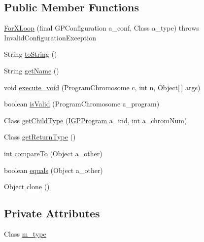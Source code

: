 \subsection*{Public Member Functions}
\begin{DoxyCompactItemize}
\item 
\hyperlink{classorg_1_1jgap_1_1gp_1_1function_1_1_for_x_loop_a1a98e5f661c0fe2ce33d090ce8a87ec1}{For\-X\-Loop} (final G\-P\-Configuration a\-\_\-conf, Class a\-\_\-type)  throws Invalid\-Configuration\-Exception 
\item 
String \hyperlink{classorg_1_1jgap_1_1gp_1_1function_1_1_for_x_loop_a7aac721900b06dcd76bf8a5586c49013}{to\-String} ()
\item 
String \hyperlink{classorg_1_1jgap_1_1gp_1_1function_1_1_for_x_loop_a34afe320938358af62df517607bf0496}{get\-Name} ()
\item 
void \hyperlink{classorg_1_1jgap_1_1gp_1_1function_1_1_for_x_loop_ae448f21b7912eec72d496b62669993e6}{execute\-\_\-void} (Program\-Chromosome c, int n, Object\mbox{[}$\,$\mbox{]} args)
\item 
boolean \hyperlink{classorg_1_1jgap_1_1gp_1_1function_1_1_for_x_loop_ae986998c90c40dfa08739a937613350f}{is\-Valid} (Program\-Chromosome a\-\_\-program)
\item 
Class \hyperlink{classorg_1_1jgap_1_1gp_1_1function_1_1_for_x_loop_a041680646bade06a1b730653aa372495}{get\-Child\-Type} (\hyperlink{interfaceorg_1_1jgap_1_1gp_1_1_i_g_p_program}{I\-G\-P\-Program} a\-\_\-ind, int a\-\_\-chrom\-Num)
\item 
Class \hyperlink{classorg_1_1jgap_1_1gp_1_1function_1_1_for_x_loop_afdf24e4274c58b8785a91dba857bebdb}{get\-Return\-Type} ()
\item 
int \hyperlink{classorg_1_1jgap_1_1gp_1_1function_1_1_for_x_loop_a4e15357fbf2370e77b1e3cf805e389b1}{compare\-To} (Object a\-\_\-other)
\item 
boolean \hyperlink{classorg_1_1jgap_1_1gp_1_1function_1_1_for_x_loop_a82a005d151cd276baf61cd5be6914656}{equals} (Object a\-\_\-other)
\item 
Object \hyperlink{classorg_1_1jgap_1_1gp_1_1function_1_1_for_x_loop_aaa0edc5219b9fc4559d443f6f28d51fb}{clone} ()
\end{DoxyCompactItemize}
\subsection*{Private Attributes}
\begin{DoxyCompactItemize}
\item 
Class \hyperlink{classorg_1_1jgap_1_1gp_1_1function_1_1_for_x_loop_a5cdee676ccb308f19bbbf2c6a14f4dee}{m\-\_\-type}
\end{DoxyCompactItemize}
